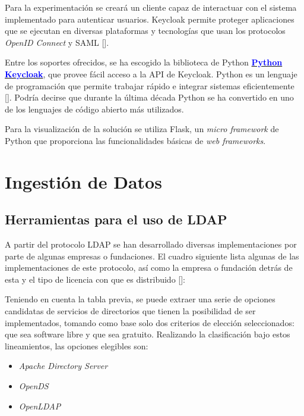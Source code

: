 Para la experimentación se creará un cliente capaz de interactuar con el sistema implementado para autenticar usuarios. Keycloak permite proteger aplicaciones que se ejecutan en diversas plataformas y tecnologías que usan los protocolos \textit{OpenID Connect } y SAML [\cite{secure_apps_2022}]. 

Entre los soportes ofrecidos, se ha escogido la biblioteca de Python \href{https://pypi.org/project/python-keycloak/}{\textcolor{blue}{\textbf{Python Keycloak}}}, que provee fácil acceso a la API de Keycloak. Python es un lenguaje de programación que permite trabajar rápido e integrar sistemas eficientemente [\cite{python_2022}]. Podría decirse que durante la última década Python se ha convertido en uno de los lenguajes de código abierto más utilizados.

Para la visualización de la solución se utiliza Flask, un \textit{micro framework} de Python que proporciona las funcionalidades básicas de\textit{ web frameworks}.

\section*{Ingestión de Datos}

\subsection*{Herramientas para el uso de LDAP}

A partir del protocolo LDAP se han desarrollado diversas implementaciones por parte de algunas empresas o fundaciones. El cuadro siguiente lista algunas de las implementaciones de este protocolo, así como la empresa o fundación detrás de esta y el tipo de licencia con que es distribuido [\cite{gonzalez2010implementacion}]:



Teniendo en cuenta la tabla previa, se puede extraer una serie de opciones candidatas de servicios de directorios que tienen la posibilidad de ser implementados, tomando como base solo dos criterios de elección seleccionados: que sea software libre y que sea gratuito. Realizando la clasificación bajo estos
lineamientos, las opciones elegibles son:

\begin{itemize}
	\item \textit{Apache Directory Server}
	\item \textit{OpenDS}
	\item \textit{OpenLDAP}
\end{itemize}

